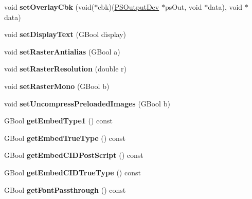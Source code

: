 \begin{DoxyCompactItemize}
void {\bfseries set\+Overlay\+Cbk} (void($\ast$cbk)(\hyperlink{class_p_s_output_dev}{P\+S\+Output\+Dev} $\ast$ps\+Out, void $\ast$data), void $\ast$data)
\item 
\mbox{\label{class_p_s_output_dev_aaae6dd8bfb5945c86c75809ced68dbad}} 
void {\bfseries set\+Display\+Text} (G\+Bool display)
\item 
\mbox{\label{class_p_s_output_dev_ab332e8f6b8326c199ece29ee093c915f}} 
void {\bfseries set\+Raster\+Antialias} (G\+Bool a)
\item 
\mbox{\label{class_p_s_output_dev_ae362998b13d2e9fdca0eb630cdb757f5}} 
void {\bfseries set\+Raster\+Resolution} (double r)
\item 
\mbox{\label{class_p_s_output_dev_aa4450df94ac9d15d91757d8d98b8de99}} 
void {\bfseries set\+Raster\+Mono} (G\+Bool b)
\item 
\mbox{\label{class_p_s_output_dev_ac6f072c70f8029d5e1cca6bb20bd3d29}} 
void {\bfseries set\+Uncompress\+Preloaded\+Images} (G\+Bool b)
\item 
\mbox{\label{class_p_s_output_dev_a4e8ef80ff842649d8c1258729cdb19a4}} 
G\+Bool {\bfseries get\+Embed\+Type1} () const
\item 
\mbox{\label{class_p_s_output_dev_af0d1fc5c4d4cf1f1747bd19cf34042e9}} 
G\+Bool {\bfseries get\+Embed\+True\+Type} () const
\item 
\mbox{\label{class_p_s_output_dev_a8bc38873855f99eb209cb3fc308774a3}} 
G\+Bool {\bfseries get\+Embed\+C\+I\+D\+Post\+Script} () const
\item 
\mbox{\label{class_p_s_output_dev_a41a23ba7a2e2988cb6e96393d655a642}} 
G\+Bool {\bfseries get\+Embed\+C\+I\+D\+True\+Type} () const
\item 
\mbox{\label{class_p_s_output_dev_acd81322452dc0993bd9f8f66100214d5}} 
G\+Bool {\bfseries get\+Font\+Passthrough} () const
\item 

\end{DoxyCompactItemize}
